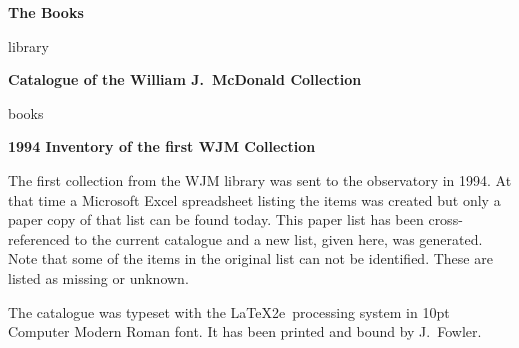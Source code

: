 \documentclass[letterpaper]{book}
\begin{document}
\vspace*{1 in}
\centerline{\Large \bf The Books}
\bigskip\bigskip
{library}
\newpage

\printbibliography

\mainmatter
\begin{center}
  {\Large \bf Catalogue of the William J.\ McDonald Collection}
\end{center}
\bigskip
{books}
\cleardoublepage

\begin{center}
  {\Large \bfseries 1994 Inventory of the first WJM Collection}
\end{center}
The first collection from the WJM library was sent to the observatory
in 1994. At that time a Microsoft Excel spreadsheet listing the items
was created but only a paper copy of that list can be found today.
This paper list has been cross-referenced to the current catalogue and
a new list, given here, was generated. Note that some of the items in
the original list can not be identified. These are listed as missing or
unknown.
\bigskip




\backmatter

\printindex[author]

\begin{colophon}
  The catalogue was typeset with the \LaTeX2e\ processing system in
  10pt Computer Modern Roman font. It has been printed and
  bound by J.~Fowler.
\end{colophon}
\end{document}
